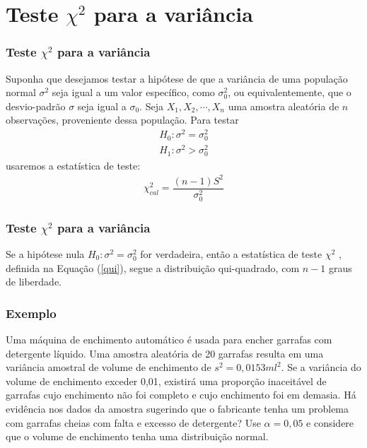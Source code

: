 \documentclass[14pt,aspectratio=1610]{beamer}
\begin{document}
\section{Teste \texorpdfstring{$\chi^{2}$}{$x^{2}$} para a variância}
\begin{frame}{}
\frametitle{Teste $\chi^{2}$ para a variância}
\small
\begin{block}{}
\justifying
Suponha que desejamos testar a hipótese de que a variância de uma população normal $\sigma^{2}$ seja igual a um valor específico, como $\sigma^{2}_{0}$, ou 
equivalentemente, que o desvio-padrão $\sigma$ seja igual a $\sigma_{0}.$ Seja $X_{1},X_{2},\cdots,X_{n}$ uma amostra aleatória de $n$ observações, proveniente 
dessa população. Para testar 
\begin{align*}
H_{0}: \sigma^{2}=\sigma_{0}^{2}\\
H_{1}:\sigma^{2}>\sigma_{0}^{2}
\end{align*}
usaremos a estatística de teste:
\begin{align}\label{qui}
\chi^{2}_{cal}=\dfrac{(n-1)S^{2}}{\sigma_{0}^{2}}
\end{align}
\end{block}
\end{frame}
\begin{frame}{}
\frametitle{Teste $\chi^{2}$ para a variância}
\begin{block}{}
\justifying
Se a hipótese nula $H_{0}: \sigma^{2}=\sigma_{0}^{2}$ for verdadeira, então a estatística de teste $\chi^{2}$ , definida na Equação (\ref{qui}), segue a distribuição qui-quadrado, 
com $n - 1$ graus de liberdade.
\end{block}
\end{frame}

\begin{frame}{}
\frametitle{Exemplo}
\begin{block}{}
\justifying
Uma máquina de enchimento automático é usada para encher garrafas com detergente líquido. Uma amostra aleatória de 20 garrafas resulta em uma variância amostral de volume de enchimento de $ s^{2}= 0,0153 ml^{2}$. Se a variância do volume de enchimento exceder 0,01, existirá uma proporção inaceitável de garrafas cujo enchimento não foi completo e cujo enchimento foi em demasia. Há evidência nos dados da amostra sugerindo que o fabricante tenha um problema com garrafas cheias com falta e excesso de detergente? Use $\alpha = 0,05$ e considere que o volume de enchimento tenha uma distribuição normal.
\end{block}
\end{frame}
\end{document}
